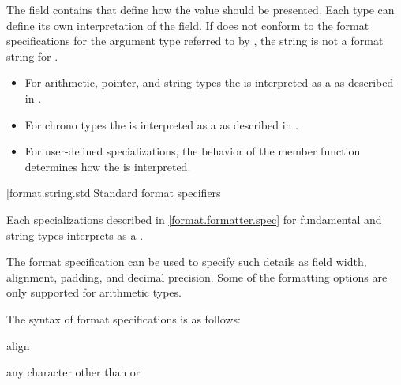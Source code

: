 \pnum
The  field contains
that define how the value should be presented.
Each type can define its own
interpretation of the  field.
If  does not conform
to the format specifications for
the argument type referred to by ,
the string is not a format string for .
\begin{example}
\begin{itemize}
\item
For arithmetic, pointer, and string types
the 
is interpreted as a 
as described in .
\item
For chrono types
the 
is interpreted as a 
as described in .
\item
For user-defined  specializations,
the behavior of the  member function
determines how the 
is interpreted.
\end{itemize}
\end{example}

[format.string.std]{Standard format specifiers}

\pnum
Each  specializations
described in \ref{format.formatter.spec}
for fundamental and string types
interprets  as a
.
\begin{note}
The format specification can be used to specify such details as
field width, alignment, padding, and decimal precision.
Some of the formatting options
are only supported for arithmetic types.
\end{note}
The syntax of format specifications is as follows:

\begin{ncbnf}
\br
      \opt{\terminal{\#}}     
\end{ncbnf}

\begin{ncbnf}
\br
     align
\end{ncbnf}

\begin{ncbnf}
\br
    \textnormal{any character other than \tcode{\{} or \tcode{\}}}
\end{ncbnf}

